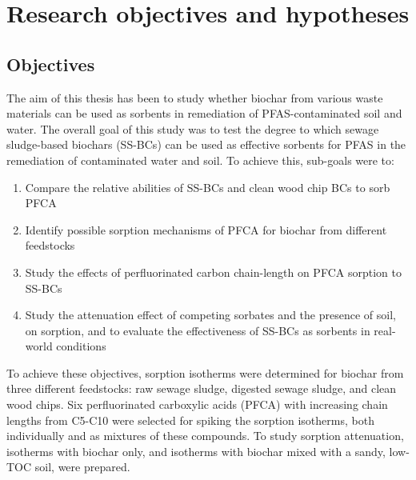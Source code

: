 \chapter{Research objectives and hypotheses}\label{chap:Objectives}
\section{Objectives}\label{sec:objectives}
The aim of this thesis has been to study whether biochar from various waste materials can be used as sorbents in remediation of PFAS-contaminated soil and water. The overall goal of this study was to test the degree to which sewage sludge-based biochars (\acrshort{SS-BCs}) can be used as effective sorbents for PFAS in the remediation of contaminated water and soil. To achieve this, sub-goals were to:

\begin{enumerate}[label=\Roman*]
    \item{Compare the relative abilities of SS-BCs and clean wood chip BCs to sorb PFCA}
    \item{Identify possible sorption mechanisms of PFCA for biochar from different feedstocks}
    \item{Study the effects of perfluorinated carbon chain-length on PFCA sorption to SS-BCs}
    \item{Study the attenuation effect of competing sorbates and the presence of soil, on sorption, and to evaluate the effectiveness of SS-BCs as sorbents in real-world conditions}
\end{enumerate}

To achieve these objectives, sorption isotherms were determined for biochar from three different feedstocks: raw sewage sludge, digested sewage sludge, and clean wood chips. Six perfluorinated carboxylic acids (PFCA) with increasing chain lengths from C5-C10 were selected for spiking the sorption isotherms, both individually and as mixtures of these compounds. To study sorption attenuation, isotherms with biochar only, and isotherms with biochar mixed with a sandy, low-\acrshort{TOC} soil, were prepared.

